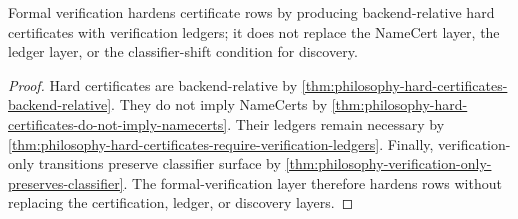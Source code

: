 \begin{theorem}
\label{thm:philosophy-formal-verification-layer-theorem}
Formal verification hardens certificate rows by producing
backend-relative hard certificates with verification ledgers; it does
not replace the NameCert layer, the ledger layer, or the classifier-shift
condition for discovery.
\end{theorem}
\begin{proof}
Hard certificates are backend-relative by
\autoref{thm:philosophy-hard-certificates-backend-relative}. They do not
imply NameCerts by
\autoref{thm:philosophy-hard-certificates-do-not-imply-namecerts}.
Their ledgers remain necessary by
\autoref{thm:philosophy-hard-certificates-require-verification-ledgers}.
Finally, verification-only transitions preserve classifier surface by
\autoref{thm:philosophy-verification-only-preserves-classifier}. The
formal-verification layer therefore hardens rows without replacing the
certification, ledger, or discovery layers.
\end{proof}


